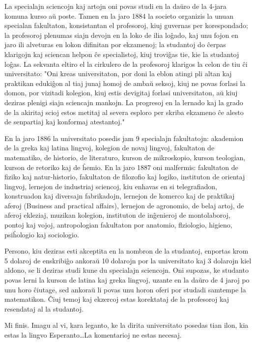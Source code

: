    La specialajn sciencojn kaj artojn oni povas studi en la da\u uro de
la 4-jara komuna kurso a\u u poste. Tamen en la jaro 1884 la societo
organizis la unuan specialan fakultaton, konsistantan el profesoroj,
kiuj guvernas per korespondado; la profesoroj plenumas siajn devojn
en la loko de ilia lo\^gado, kaj unu fojon en jaro ili alveturas en
lokon difinitan por ekzamenoj; la studantoj do \^cerpas klarigojn
kaj sciencan helpon \^ce specialistoj, kiuj trovi\^gas tie, kie la
studantoj lo\^gas. La sekvanta eltiro el la cirkulero de la
profesoroj klarigos la celon de tiu \^ci universitato: "Oni kreas
universitaton, por doni la eblon atingi pli altan kaj praktikan
eduki\^gon al tiaj junaj homoj de amba\u u seksoj, kiuj ne povas
forlasi la domon, por vizitadi kolegion, kiuj estis devigitaj
forlasi universitaton, a\u u kiuj deziras plenigi siajn sciencajn
mankojn. La progresoj en la lernado kaj la grado de la akiritaj
scioj estos metitaj al severa esploro per skriba ekzameno \^ce
alesto de senpartiaj kaj konformaj atestantoj."

   En la jaro 1886 la universitato posedis jam 9 specialajn
fakultatojn: akademion de la greka kaj latina lingvoj, kolegion de
novaj lingvoj, fakultaton de matematiko, de historio, de literaturo,
kurson de mikroskopio, kurson teologian, kurson de retoriko kaj de
\^hemio. En la jaro 1887 oni malfermis: fakultaton de fiziko kaj
natur-historio, fakultaton de filozofio kaj logiko, instituton de
orientaj lingvoj, lernejon de industriaj sciencoj, kiu enhavas en si
telegrafiadon, konstruadon kaj diversajn fabrikadojn, lernejon de
komerco kaj de praktikaj aferoj (Business and practical affairs),
lernejon de agronomio, de belaj artoj, de aferoj ekleziaj, muzikan
kolegion, instituton de in\^genieroj de montolaboroj, pontoj kaj
vojoj, antropologian fakultaton por anatomio, flziologio, higieno,
psi\^hologio kaj sociologio.

   Persono, kiu deziras esti akceptita en la nombron de la studantoj,
enportas krom 5 dolaroj de enskribi\^go ankora\u u 10 dolarojn por
la universitato kaj 3 dolarojn kiel aldono, se li deziras studi kune
du specialajn sciencojn. Oni supozas, ke studanto povas lerni la
kurson de latina kaj greka lingvoj, uzante en la da\u uro de 4 jaroj
po unu horo \^ciutage, sed ankora\u u li povas unu horon oferi por
studadi samtempe la matematikon. \^Ciuj temoj kaj ekzercoj estas
korektataj de la profesoroj kaj resendataj al la studantoj.

   Mi finis. Imagu al vi, kara leganto, ke la dirita universitato
posedas tian ilon, kia estas la lingvo Esperanto\dots La komentarioj
ne estas necesaj.

\begin{flushright}
\footnotesize {}
\end{flushright}

\smallrule{}
